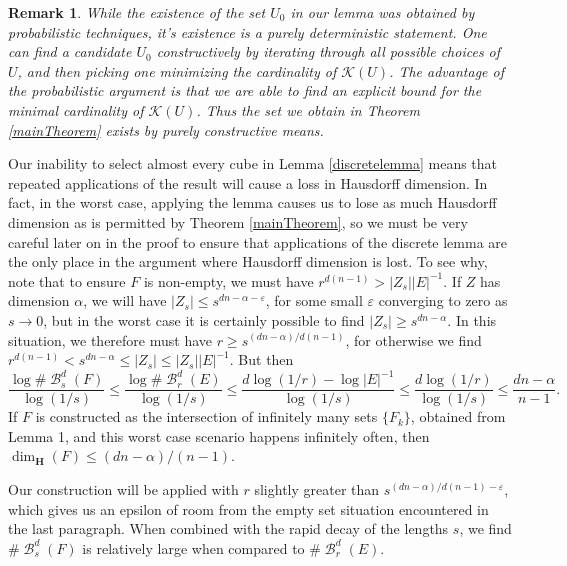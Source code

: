 \documentclass[dvipsnames,letterpaper,12pt]{article}
\theoremstyle{plain}
\newtheorem*{remark}{Remark}
\DeclareMathOperator{\B}{\mathcal{B}}
\begin{document}
\begin{remark}
	While the existence of the set $U_0$ in our lemma was obtained by probabilistic techniques, it's existence is a purely deterministic statement. One can find a candidate $U_0$ constructively by iterating through all possible choices of $U$, and then picking one minimizing the cardinality of $\mathcal{K}(U)$. The advantage of the probabilistic argument is that we are able to find an explicit bound for the minimal cardinality of $\mathcal{K}(U)$. Thus the set we obtain in Theorem \ref{mainTheorem} exists by purely constructive means.
\end{remark}

Our inability to select almost every cube in Lemma \ref{discretelemma} means that repeated applications of the result will cause a loss in Hausdorff dimension. In fact, in the worst case, applying the lemma causes us to lose as much Hausdorff dimension as is permitted by Theorem \ref{mainTheorem}, so we must be very careful later on in the proof to ensure that applications of the discrete lemma are the only place in the argument where Hausdorff dimension is lost. To see why, note that to ensure $F$ is non-empty, we must have $r^{d(n-1)} > |Z_s| |E|^{-1}$. If $Z$ has dimension $\alpha$, we will have $|Z_s| \leq s^{dn - \alpha - \varepsilon}$, for some small $\varepsilon$ converging to zero as $s \to 0$, but in the worst case it is certainly possible to find $|Z_s| \geq s^{dn - \alpha}$. In this situation, we therefore must have $r \geq s^{(dn - \alpha)/d(n-1)}$, for otherwise we find $r^{d(n-1)} < s^{dn - \alpha} \leq |Z_s| \leq |Z_s||E|^{-1}$. But then
%
\[ \frac{\log \# \B^d_s(F)}{\log(1/s)} \leq \frac{\log \# \B^d_r(E)}{\log(1/s)} \leq \frac{d \log (1/r) - \log |E|^{-1}}{\log(1/s)} \leq \frac{d \log(1/r)}{\log(1/s)} \leq \frac{dn - \alpha}{n - 1}. \]
%
If $F$ is constructed as the intersection of infinitely many sets $\{ F_k \}$, obtained from Lemma 1, and this worst case scenario happens infinitely often, then $\dim_{\mathbf{H}}(F) \leq (dn - \alpha)/(n-1)$.

Our construction will be applied with $r$ slightly greater than $s^{(dn-\alpha)/d(n-1) - \varepsilon}$, which gives us an epsilon of room from the empty set situation encountered in the last paragraph. When combined with the rapid decay of the lengths $s$, we find $\# \B^d_s(F)$ is relatively large when compared to $\# \B^d_r(E)$.
\end{document}
